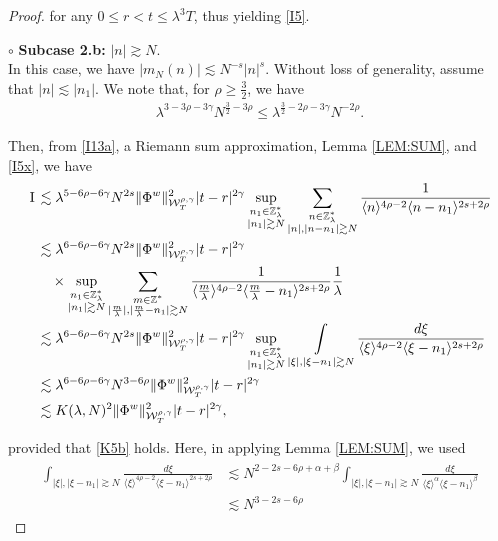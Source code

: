 \documentclass[letterpaper, 11pt,  reqno]{amsart}
\DeclareMathOperator*{\intt}{\int}
\newcommand{\1}{\hspace{0.5mm}\text{I}\hspace{0.5mm}}
\newcommand{\noi}{\noindent}
\newcommand{\Z}{\mathbb{Z}}
\newcommand{\al}{\alpha}
\newcommand{\be}{\beta}
\newcommand{\g}{\gamma}
\newcommand{\ld}{\lambda}
\newcommand{\les}{\lesssim}
\newcommand{\ges}{\gtrsim}
\newcommand{\jb}[1]
{\langle #1 \rangle}
\newcommand{\W}{\mathcal{W}}
\numberwithin{equation}{section}
\numberwithin{theorem}{section}
\begin{document}
\begin{proof}
 \noi
for any $0\leq r<t\leq \ld^3T$, 
thus yielding \eqref{I5}.


\medskip


\noi
$\circ$ {\bf Subcase 2.b:}  $|n| \ges N$.\\
\indent
In this case, we have   $|m_N(n)| \les  N^{-s} |n|^{s}$.
Without loss of generality, assume that $|n|\les |n_1|$.
We note that, for $\rho \ge \frac 32$, we have 
\begin{align}
\ld^{3- 3\rho-3\g} N^{\frac 32 - 3\rho}
\le
\ld^{ \frac 32 - 2\rho - 3\g} N^{-2\rho}.
\label{I5x}
\end{align}

\noi
Then, from \eqref{I13a}, a Riemann sum approximation, 
Lemma \ref{LEM:SUM}, 
and 
\eqref{I5x}, we have
\begin{align}
\1
&\les 
\ld^{5-6\rho -6\g}N^{2s }
\| \Phi^{w} \|^2_{\W_{T}^{\rho, \g}} 
|t-r|^{2\g}
\sup_{\substack{n_1 \in \Z_\ld^*\\|n_1|\ges N} }
\sum_{\substack{n \in \Z_\ld^*\\|n|, |n- n_1|\ges N}} 
\frac{1}{\jb{n}^{4\rho - 2}\jb{n - n_1}^{2s+2\rho}}
\notag \\
&\les 
\ld^{6-6\rho -6\g}N^{2s }
\| \Phi^{w} \|^2_{\W_{T}^{\rho, \g}} 
|t-r|^{2\g}  \notag \\
& \quad 
\times 
\sup_{\substack{n_1 \in \Z_\ld^*\\|n_1|\ges N} }
 \sum_{\substack{m \in \Z^*\\ |\frac m\ld |, |\frac m\ld - n_1|\ges  N}} 
\frac{1}{\jb{\frac{m}{\ld}}^{4\rho - 2}
\jb{ \frac m\ld - n_1}^{2s + 2\rho}}
 \frac 1\ld
\label{I16x}\\
&\les 
\ld^{6-6\rho -6\g}N^{2s }
\| \Phi^{w} \|^2_{\W_{T}^{\rho, \g}} 
|t-r|^{2\g}
\sup_{\substack{n_1 \in \Z_\ld^*\\|n_1|\ges N} }
\intt_{|\xi|, |\xi - n_1|\ges N} 
\frac{d\xi}{\jb{\xi}^{4\rho - 2}
\jb{ \xi - n_1}^{2s + 2\rho}} \notag \\
 &\les 
\ld^{6-6\rho -6\g}N^{3-6\rho }
 \| \Phi^{w} \|^2_{\W_{T}^{\rho, \g}}  
|t-r|^{2\g} \notag \\
 &\les 
K(\ld, N)^2
 \| \Phi^{w} \|^2_{\W_{T}^{\rho, \g}}  
|t-r|^{2\g}, \notag 
\end{align}

\noi
provided that 
  \eqref{K5b} holds.
 Here, in applying Lemma \ref{LEM:SUM}, 
we used 
\begin{align}
\begin{split}
\intt_{|\xi|, |\xi - n_1|\ges N} 
\frac{d\xi}{\jb{\xi}^{4\rho - 2}
\jb{ \xi - n_1}^{2s + 2\rho}}
& \les N^{2- 2s - 6\rho + \al +\be}
\intt_{|\xi|, |\xi - n_1|\ges N} 
\frac{d\xi}{\jb{\xi}^{\al}
\jb{ \xi - n_1}^{\be}}
\\
& \les N^{3- 2s - 6\rho}
\end{split}
\label{I16}
\end{align}


\end{proof}
\end{document}
